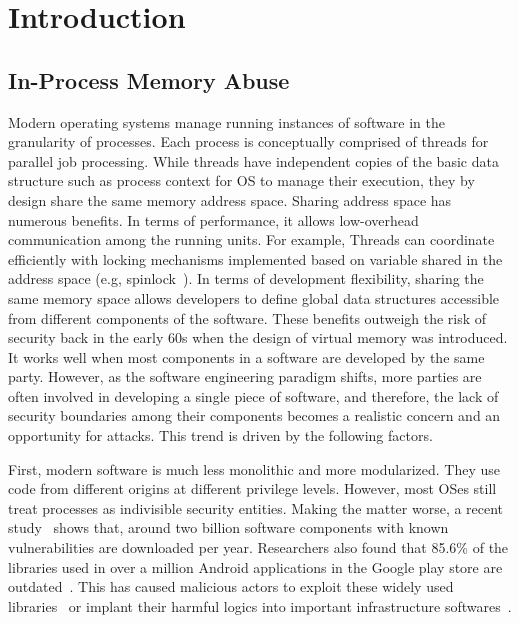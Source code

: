 \section{Introduction}
\subsection{In-Process Memory Abuse}
Modern operating systems manage running instances of software in the granularity of processes. 
Each process is conceptually comprised of threads for parallel job processing. While threads have 
independent copies of the basic data structure such as process context for OS to manage their execution, they by design share the same memory address space. Sharing address space has numerous benefits. In terms of performance, it allows low-overhead communication among the running units. For example, Threads can coordinate efficiently with locking mechanisms implemented based on variable shared in the address space (e.g, spinlock~\cite{spinlock}). In terms of development flexibility, sharing the same memory space allows developers to define global data structures accessible from different components of the software.
These benefits outweigh the risk of security back in the early 60s when the design of virtual memory was introduced. It works well when most components in a software are developed by the same party. However, as the software engineering paradigm shifts, more parties are often involved in developing a single piece of software, and therefore, the lack of security boundaries among their components becomes a realistic concern and an opportunity for attacks. This trend is driven by the following factors.

First, modern software is much less monolithic and more modularized. They use code from different origins at different privilege levels. 
However, most OSes still treat processes as indivisible security entities. Making the matter worse, a recent study~\cite{enigmasurvey} shows that, around two billion software components with known vulnerabilities are downloaded per year. 
Researchers also found that 85.6\% of the libraries used in over a million Android applications in the Google play store are outdated~\cite{3rdpartysurvey}. 
This has caused malicious actors to exploit these widely used libraries~\cite{taomikesdk,baidusdk,fbsdk,dropboxsdk} or implant their harmful logics into important infrastructure softwares~\cite{xcodeghost}. 


